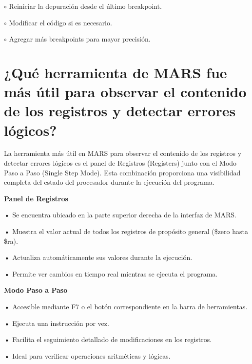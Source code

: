 \documentclass{article}
\begin{document}
\quad

$\circ$ {Reiniciar la depuración desde el último breakpoint.}

$\circ$ {Modificar el código si es necesario.}

$\circ$ {Agregar más breakpoints para mayor precisión.}

\quad
\newpage







\section{¿Qué herramienta de MARS fue más útil para observar el contenido de los registros y detectar errores lógicos?}

\quad

{ La herramienta más útil en MARS para observar el contenido de los registros y detectar errores lógicos es el panel de Registros (Registers) junto con el Modo Paso a Paso (Single Step Mode). Esta combinación proporciona una visibilidad completa del estado del procesador durante la ejecución del programa.}

\quad

\textbf{ Panel de Registros}

\quad

\textbf{•   } { Se encuentra ubicado en la parte superior derecha de la interfaz de MARS.}

\textbf{•   } { Muestra el valor actual de todos los registros de propósito general (\$zero hasta \$ra).}

\textbf{•   } { Actualiza automáticamente sus valores durante la ejecución.}

\textbf{•   } { Permite ver cambios en tiempo real mientras se ejecuta el programa.}

\quad


\textbf{ Modo Paso a Paso}

\quad

\textbf{•   } { Accesible mediante F7 o el botón correspondiente en la barra de herramientas.}

\textbf{•   } { Ejecuta una instrucción por vez.}

\textbf{•   } { Facilita el seguimiento detallado de modificaciones en los registros.}

\textbf{•   } { Ideal para verificar operaciones aritméticas y lógicas.}




\quad
\newpage
\end{document}
